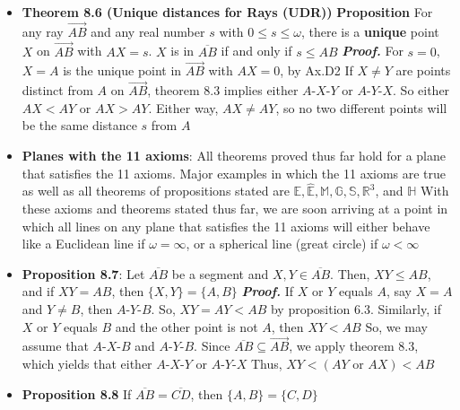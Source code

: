 \documentclass{report}
\begin{document}
\begin{itemize}
        \item \textbf{Theorem 8.6 (Unique distances for Rays (UDR))}
            \bigbreak \noindent 
            \textbf{Proposition} For any ray $ \overrightarrow{AB}$ and any real number $s$ with $0 \leq s \leq \omega$, there is a \textbf{unique} point $X$ on $\overrightarrow{AB}$ with $AX = s$. $X$ is in $\overline{AB}$ if and only if $s \leq   AB $
            \bigbreak \noindent 
            \textbf{\textit{Proof.}} For $s=0$, $X = A$ is the unique point in $\overrightarrow{AB}$ with $AX = 0$, by Ax.D2
            \bigbreak \noindent 
            If $X \ne Y$ are points distinct from $A$ on $\overrightarrow{AB}$, theorem 8.3 implies either $ A\text{-}X\text{-}Y $ or $ A\text{-}Y\text{-}X$. So either $ AX < AY$ or $ AX > AY$. Either way,  $AX \ne AY$, so no two different points will be the same distance $s$ from $A$
        \item \textbf{Planes with the 11 axioms}: All theorems proved thus far hold for a plane that satisfies the 11 axioms. Major examples in which the 11 axioms are true as well as all theorems of propositions stated are $\mathbb{E}, \hat{\mathbb{E}}, \mathbb{M}, \mathbb{G}, \mathbb{S}, \mathbb{R}^{3}$, and $\mathbb{H}$
            \bigbreak \noindent 
            With these axioms and theorems stated thus far, we are soon arriving at a point in which all lines on any plane that satisfies the 11 axioms will either behave like a Euclidean  line if $\omega = \infty$, or a spherical line (great circle) if $\omega < \infty $
        \item \textbf{Proposition 8.7}: Let $\overline{AB}$ be a segment and $X,Y \in \overline{AB}$. Then, $XY \leq AB$, and if $XY = AB$, then $\{X,Y\} = \{A,B\}$
            \bigbreak \noindent 
            \textbf{\textit{Proof.}} If $X$ or $Y$ equals $A$, say $X = A$ and $Y \ne B$, then $ A\text{-}Y\text{-}B$. So, $XY = AY < AB$ by proposition 6.3. Similarly, if $X$ or $Y$ equals $B$ and the other point is not $A$, then $XY < AB$
            \bigbreak \noindent 
            So, we may assume that $ A\text{-}X\text{-}B$ and $ A\text{-}Y\text{-}B$. 
            \bigbreak \noindent 
            Since $ \overline{AB} \subseteq \overrightarrow{AB} $, we apply theorem 8.3, which yields that either $ A\text{-}X\text{-}Y$ or $ A\text{-}Y\text{-}X $
            \bigbreak \noindent 
            Thus, $XY < (AY \text{ or } AX ) < AB $ \endpf
        \item \textbf{Proposition 8.8} If $\overline{AB} = \overline{CD}$, then $\{A,B\}  = \{C,D\}$
            \bigbreak \noindent 

\end{itemize}
\end{document}
